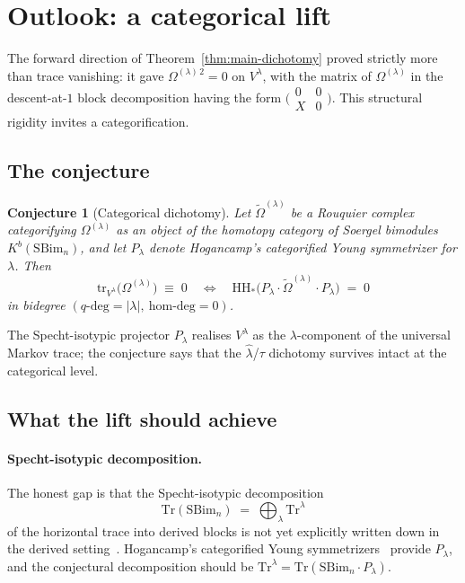 \documentclass[11pt]{article}
\newtheorem{conjecture}[theorem]{Conjecture}
\theoremstyle{definition}
\newcommand{\Vlam}{V^{\lambda}}
\newcommand{\Om}{\Omega}
\newcommand{\bla}{\widehat\lambda}
\newcommand{\tr}{\mathrm{tr}}
\newcommand{\HHom}{\mathrm{HH}}
\newcommand{\SBim}{\mathrm{SBim}}
\begin{document}
\section{Outlook: a categorical lift}\label{sec:outlook}

The forward direction of Theorem~\ref{thm:main-dichotomy} proved strictly more than trace vanishing: it gave $\Om^{(\lambda)\,2} = 0$ on $\Vlam$, with the matrix of $\Om^{(\lambda)}$ in the descent-at-$1$ block decomposition having the form $\bigl(\begin{smallmatrix} 0 & 0 \\ X & 0 \end{smallmatrix}\bigr)$.  This structural rigidity invites a categorification.

\subsection{The conjecture}

\begin{conjecture}[Categorical dichotomy]\label{conj:categorical}
Let $\widetilde\Om^{(\lambda)}$ be a Rouquier complex categorifying $\Om^{(\lambda)}$ as an object of the homotopy category of Soergel bimodules $K^b(\SBim_n)$, and let $P_\lambda$ denote Hogancamp's categorified Young symmetrizer for $\lambda$.  Then
\[
   \tr_{\Vlam}\!\bigl(\Om^{(\lambda)}\bigr) \;\equiv\; 0
   \quad\Longleftrightarrow\quad
   \HHom_*\bigl(P_\lambda \cdot \widetilde\Om^{(\lambda)} \cdot P_\lambda\bigr) \;=\; 0
\]
in bidegree $(q\text{-deg} = |\lambda|,\ \text{hom-deg} = 0)$.
\end{conjecture}

The Specht-isotypic projector $P_\lambda$ realises $\Vlam$ as the $\lambda$-component of the universal Markov trace; the conjecture says that the $\bla$/$\tau$ dichotomy survives intact at the categorical level.

\subsection{What the lift should achieve}

\paragraph{Specht-isotypic decomposition.}  The honest gap is that the Specht-isotypic decomposition
\[
   \mathrm{Tr}(\SBim_n) \;=\; \bigoplus_\lambda \mathrm{Tr}^\lambda
\]
of the horizontal trace into derived blocks is not yet explicitly written down in the derived setting~\cite{ghw2020derived}.  Hogancamp's categorified Young symmetrizers~\cite{hogancamp2015symmetrizers,abelhogancamp2015} provide $P_\lambda$, and the conjectural decomposition should be $\mathrm{Tr}^\lambda = \mathrm{Tr}(\SBim_n \cdot P_\lambda)$.
\end{document}
